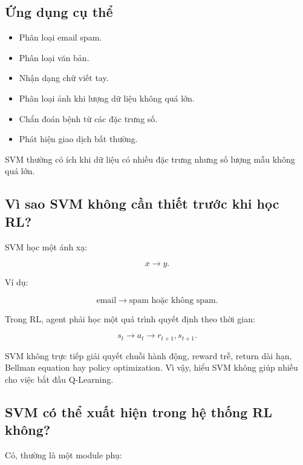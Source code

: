\documentclass[12pt,a4paper]{report}
\begin{document}
\subsection{Ứng dụng cụ thể}

\begin{itemize}[leftmargin=1.5em]
    \item Phân loại email spam.
    \item Phân loại văn bản.
    \item Nhận dạng chữ viết tay.
    \item Phân loại ảnh khi lượng dữ liệu không quá lớn.
    \item Chẩn đoán bệnh từ các đặc trưng số.
    \item Phát hiện giao dịch bất thường.
\end{itemize}

SVM thường có ích khi dữ liệu có nhiều đặc trưng nhưng số lượng mẫu không quá lớn.

\subsection{Vì sao SVM không cần thiết trước khi học RL?}

SVM học một ánh xạ:

\begin{equation}
x \rightarrow y.
\end{equation}

Ví dụ:

\begin{equation}
\text{email}
\rightarrow
\text{spam hoặc không spam}.
\end{equation}

Trong RL, agent phải học một quá trình quyết định theo thời gian:

\begin{equation}
s_t
\rightarrow
a_t
\rightarrow
r_{t+1},s_{t+1}.
\end{equation}

SVM không trực tiếp giải quyết chuỗi hành động, reward trễ, return dài hạn, Bellman equation hay policy optimization. Vì vậy, hiểu SVM không giúp nhiều cho việc bắt đầu Q-Learning.

\subsection{SVM có thể xuất hiện trong hệ thống RL không?}

Có, thường là một module phụ:
\end{document}
